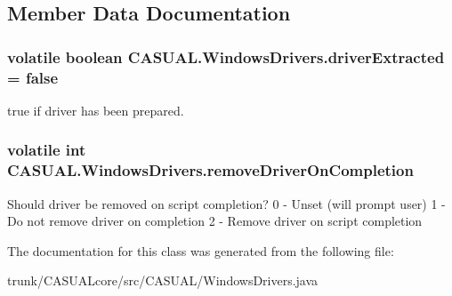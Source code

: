 \subsection{Member Data Documentation}
\hypertarget{classCASUAL_1_1WindowsDrivers_aeffffe5b6287581f84fab6058eb72bfc}{
\subsubsection[{driver\-Extracted}]{\setlength{\rightskip}{0pt plus 5cm}volatile boolean C\-A\-S\-U\-A\-L.\-Windows\-Drivers.\-driver\-Extracted = false\hspace{0.3cm}{\ttfamily [static]}}}\label{classCASUAL_1_1WindowsDrivers_aeffffe5b6287581f84fab6058eb72bfc}
true if driver has been prepared. \hypertarget{classCASUAL_1_1WindowsDrivers_a59919a5f38e8d9ff9eda58fb443e039e}{
\subsubsection[{remove\-Driver\-On\-Completion}]{\setlength{\rightskip}{0pt plus 5cm}volatile int C\-A\-S\-U\-A\-L.\-Windows\-Drivers.\-remove\-Driver\-On\-Completion\hspace{0.3cm}{\ttfamily [static]}}}\label{classCASUAL_1_1WindowsDrivers_a59919a5f38e8d9ff9eda58fb443e039e}
Should driver be removed on script completion? 0 -\/ Unset (will prompt user) 1 -\/ Do not remove driver on completion 2 -\/ Remove driver on script completion 

The documentation for this class was generated from the following file\-:\begin{DoxyCompactItemize}
\item 
trunk/\-C\-A\-S\-U\-A\-Lcore/src/\-C\-A\-S\-U\-A\-L/Windows\-Drivers.\-java\end{DoxyCompactItemize}
